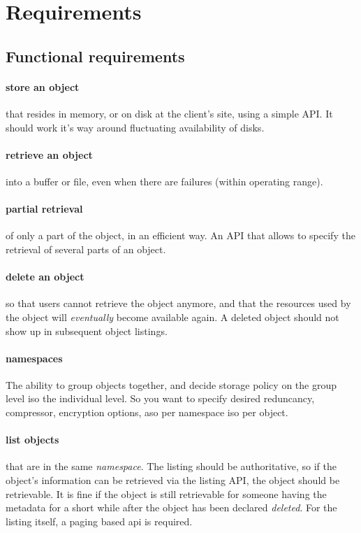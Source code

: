 \section{Requirements}
\subsection{Functional requirements}
\paragraph{store an object} that resides in memory,
or on disk at the client's site, using a simple API.
It should work it's way around fluctuating availability of disks.

\paragraph{retrieve an object} into a buffer or file,
even when there are failures (within operating range).

\paragraph{partial retrieval} of only a part of the object, in an efficient way.
An API that allows to specify the retrieval of several parts of an object.

\paragraph{delete an object} so that users cannot retrieve the object anymore,
and that the resources used by the object will \emph{eventually} become available again.
A deleted object should not show up in subsequent object listings.

\paragraph{namespaces} The ability to group objects together,
and decide storage policy on the group level iso the individual level.
So you want to specify desired reduncancy, compressor, encryption options, aso per
namespace iso per object.

\paragraph{list objects} that are in the same \emph{namespace}.
The listing should be authoritative, so
if the object's information can be retrieved via the listing API,
the object should be retrievable. It is fine if the object
is still retrievable for someone having the metadata for a short while
after the object has been declared \emph{deleted}.
For the listing itself, a paging based api is required.


